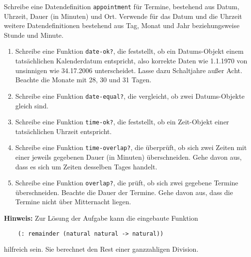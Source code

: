 \begin{aufgabe}

  Schreibe eine Datendefinition
  \lstinline{appointment} für Termine, bestehend aus Datum, Uhrzeit,
  Dauer (in Minuten) und Ort.  Verwende für das Datum und die
  Uhrzeit weitere Datendefinitionen bestehend aus Tag, Monat und Jahr
  beziehungsweise Stunde und Minute.

  \begin{enumerate}
  \item Schreibe eine Funktion \lstinline{date-ok?}, die feststellt,
    ob ein Datums-Objekt einem tatsächlichen Kalenderdatum entspricht,
    also korrekte Daten wie 1.1.1970 von unsinnigen wie 34.17.2006
    unterscheidet. Lasse dazu Schaltjahre außer Acht. Beachte
    die Monate mit 28, 30 und 31 Tagen.
  \item Schreibe eine Funktion \lstinline{date-equal?}, die
    vergleicht, ob zwei Datums-Objekte gleich sind.
  \item Schreibe eine Funktion \lstinline{time-ok?}, die feststellt,
    ob ein Zeit-Objekt einer tatsächlichen Uhrzeit entspricht.
  \item Schreibe eine Funktion \lstinline{time-overlap?}, die
    überprüft, ob sich zwei Zeiten mit einer jeweils gegebenen Dauer
    (in Minuten) überschneiden. Gehe davon aus, dass es sich um
    Zeiten desselben Tages handelt.
  \item Schreibe eine Funktion \lstinline{overlap?}, die prüft, ob
    sich zwei gegebene Termine überschneiden. Beachte die Dauer
    der Termine. Gehe davon aus, dass die Termine nicht über
    Mitternacht liegen.
  \end{enumerate}
  \textbf{Hinweis:} Zur Lösung der Aufgabe kann die eingebaute
  Funktion
  \begin{lstlisting}
    (: remainder (natural natural -> natural))
  \end{lstlisting}

  hilfreich sein. Sie berechnet den Rest einer ganzzahligen Division.

\end{aufgabe}


